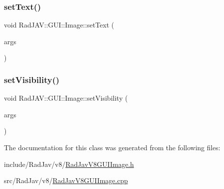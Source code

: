 \mbox{\label{class_rad_j_a_v_1_1_g_u_i_1_1_image_a91ea76ac7c12ea1b01a7b62b35149509}} 
\subsubsection{\texorpdfstring{set\+Text()}{setText()}}
{\footnotesize\ttfamily void Rad\+J\+A\+V\+::\+G\+U\+I\+::\+Image\+::set\+Text (\begin{DoxyParamCaption}\item[{const v8\+::\+Function\+Callback\+Info$<$ v8\+::\+Value $>$ \&}]{args }\end{DoxyParamCaption})\hspace{0.3cm}{\ttfamily [static]}}

\mbox{\label{class_rad_j_a_v_1_1_g_u_i_1_1_image_ac210b50acae9b6cf78ec0d4b47305074}} 
\subsubsection{\texorpdfstring{set\+Visibility()}{setVisibility()}}
{\footnotesize\ttfamily void Rad\+J\+A\+V\+::\+G\+U\+I\+::\+Image\+::set\+Visibility (\begin{DoxyParamCaption}\item[{const v8\+::\+Function\+Callback\+Info$<$ v8\+::\+Value $>$ \&}]{args }\end{DoxyParamCaption})\hspace{0.3cm}{\ttfamily [static]}}



The documentation for this class was generated from the following files\+:\begin{DoxyCompactItemize}
\item 
include/\+Rad\+Jav/v8/\mbox{\hyperlink{_rad_jav_v8_g_u_i_image_8h}{Rad\+Jav\+V8\+G\+U\+I\+Image.\+h}}\item 
src/\+Rad\+Jav/v8/\mbox{\hyperlink{_rad_jav_v8_g_u_i_image_8cpp}{Rad\+Jav\+V8\+G\+U\+I\+Image.\+cpp}}\end{DoxyCompactItemize}
